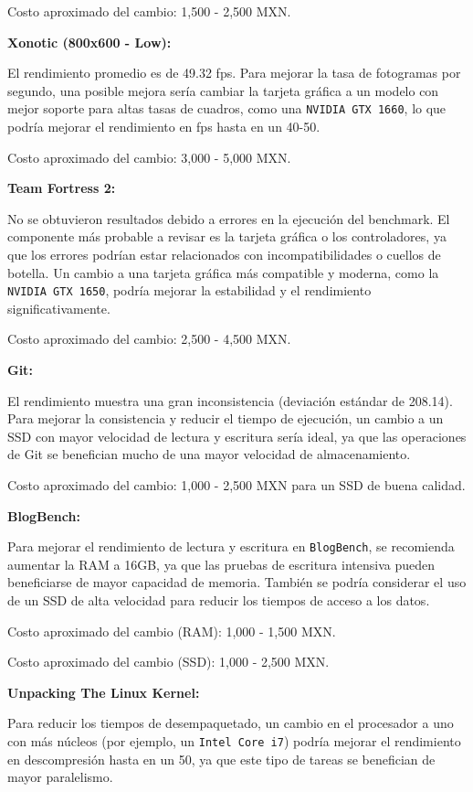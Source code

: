 \documentclass[12pt]{article}
\begin{document}
\begin{enumerate}[label=(\arabic{section}.\arabic{subsection}.\arabic{enumi})]
Costo aproximado del cambio: 1,500 - 2,500 MXN.

\textbf{Xonotic (800x600 - Low):}

El rendimiento promedio es de 49.32 fps. Para mejorar la tasa de fotogramas por segundo, una posible mejora sería cambiar la tarjeta gráfica a un modelo con mejor soporte para altas tasas de cuadros, como una \texttt{NVIDIA GTX 1660}, lo que podría mejorar el rendimiento en fps hasta en un 40-50.

Costo aproximado del cambio: 3,000 - 5,000 MXN.

\textbf{Team Fortress 2:}

No se obtuvieron resultados debido a errores en la ejecución del benchmark. El componente más probable a revisar es la tarjeta gráfica o los controladores, ya que los errores podrían estar relacionados con incompatibilidades o cuellos de botella. Un cambio a una tarjeta gráfica más compatible y moderna, como la \texttt{NVIDIA GTX 1650}, podría mejorar la estabilidad y el rendimiento significativamente.

Costo aproximado del cambio: 2,500 - 4,500 MXN.

\textbf{Git:}

El rendimiento muestra una gran inconsistencia (deviación estándar de 208.14). Para mejorar la consistencia y reducir el tiempo de ejecución, un cambio a un SSD con mayor velocidad de lectura y escritura sería ideal, ya que las operaciones de Git se benefician mucho de una mayor velocidad de almacenamiento.

Costo aproximado del cambio: 1,000 - 2,500 MXN para un SSD de buena calidad.

\textbf{BlogBench:}

Para mejorar el rendimiento de lectura y escritura en \texttt{BlogBench}, se recomienda aumentar la RAM a 16GB, ya que las pruebas de escritura intensiva pueden beneficiarse de mayor capacidad de memoria. También se podría considerar el uso de un SSD de alta velocidad para reducir los tiempos de acceso a los datos.

Costo aproximado del cambio (RAM): 1,000 - 1,500 MXN.

Costo aproximado del cambio (SSD): 1,000 - 2,500 MXN.

\textbf{Unpacking The Linux Kernel:}

Para reducir los tiempos de desempaquetado, un cambio en el procesador a uno con más núcleos (por ejemplo, un \texttt{Intel Core i7}) podría mejorar el rendimiento en descompresión hasta en un 50, ya que este tipo de tareas se benefician de mayor paralelismo.


\end{enumerate}
\end{document}

